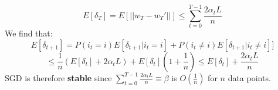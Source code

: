 \documentclass{article}
\begin{document}
\begin{equation}
    E[\delta_T] = E[|| w_T - w_T' ||] \leq  \sum_{t=0} ^ {T-1}  \frac{ 2 \alpha_t L }{n}
\end{equation}
We find that:
    \[
    E[\delta_{t+1}] = P(i_t=i)E[\delta_{t+1}|i_t=i] + P(i_t \neq i)E[\delta_{t+1}|i_t \neq i]] 
    \]
    \[
    \leq \frac{1}{n}(E[\delta_t] + 2\alpha_t L) + E[\delta_t](1+\frac{1}{n}) \leq E[\delta_t] + \frac{2 \alpha_t L}{n}
    \]
SGD is therefore \textbf{stable} since $\sum_{t=0} ^ {T-1}  \frac{ 2 \alpha_t L }{n} \equiv \beta$ is $O(\frac{1}{n})$ for $n$ data points.
%
%




\end{document}
